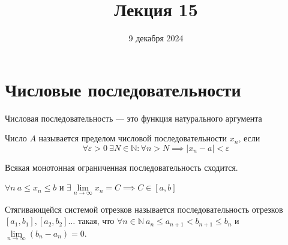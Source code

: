 \documentclass{article}
\title{Лекция 15}
\author{9 декабря 2024}
\date{}
\begin{document}
\maketitle

\section{Числовые последовательности}

\begin{definition}
    Числовая последовательность --- это функция натурального аргумента 
\end{definition}

\begin{definition}
    Число \(A\) называется пределом числовой последовательности \(x_n\), если
    \[
        \forall \varepsilon > 0\ \exists N \in \mathbb{N}: \forall n > N \implies \left\vert x_n - a \right\vert < \varepsilon 
    \]  
\end{definition}

\begin{theorem}
    \noindent Всякая монотонная ограниченная последовательность сходится.
\end{theorem}

\begin{theorem}
    \(\forall n\ a \leq x_n \leq b \) и \(\exists \lim\limits_{n \to \infty} x_n = C \implies C \in {[a, b]}\) 
\end{theorem}

\begin{definition}
    Стягивающейся системой отрезков называется последовательность отрезков \({[a_1, b_1]}, {[a_2, b_2]} \dots\) такая, что \(\forall n \in \mathbb{N}\ a_n \leq a_{n + 1} < b_{n + 1} \leq b_{n}\) и \( \lim\limits_{n \to \infty} (b_n - a_n) = 0\).  
\end{definition}
\end{document}
